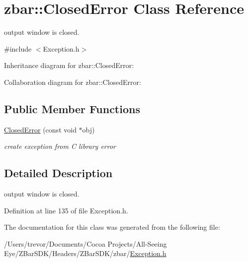 \hypertarget{classzbar_1_1_closed_error}{
\section{zbar::ClosedError Class Reference}
\label{classzbar_1_1_closed_error}
}


output window is closed.  




{\ttfamily \#include $<$Exception.h$>$}



Inheritance diagram for zbar::ClosedError:


Collaboration diagram for zbar::ClosedError:
\subsection*{Public Member Functions}
\begin{DoxyCompactItemize}
\item 
\hypertarget{classzbar_1_1_closed_error_a128255862f3dad2b86b6aa6748481de4}{
\hyperlink{classzbar_1_1_closed_error_a128255862f3dad2b86b6aa6748481de4}{ClosedError} (const void $\ast$obj)}
\label{classzbar_1_1_closed_error_a128255862f3dad2b86b6aa6748481de4}

\begin{DoxyCompactList}\small\item\em create exception from C library error \end{DoxyCompactList}\end{DoxyCompactItemize}


\subsection{Detailed Description}
output window is closed. 

Definition at line 135 of file Exception.h.



The documentation for this class was generated from the following file:\begin{DoxyCompactItemize}
\item 
/Users/trevor/Documents/Cocoa Projects/All-\/Seeing Eye/ZBarSDK/Headers/ZBarSDK/zbar/\hyperlink{_exception_8h}{Exception.h}\end{DoxyCompactItemize}
